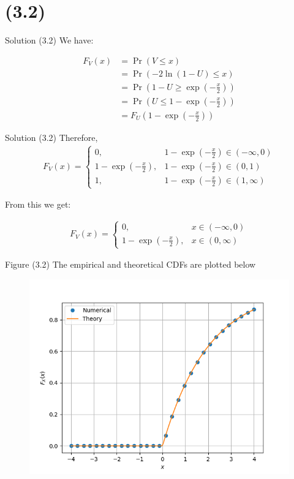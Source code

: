 \documentclass{beamer}
\providecommand{\pr}[1]{\ensuremath{\Pr\left(#1\right)}}
\begin{document}
\section{(3.2)}
\begin{frame}{Solution (3.2)}
    We have:
    
    \begin{align}
    F_V(x) &= \pr{V \leq x} \\
    &= \pr{-2\ln(1-U) \leq x} \\
    &= \pr{1-U \geq	\exp{\left(-\frac{x}{2}\right)}} \\
    &= \pr{U \leq 1 - \exp{\left(-\frac{x}{2}\right)}} \\
    &= F_U\left(1 - \exp{\left(-\frac{x}{2}\right)}\right) 
    \end{align}
    
    \end{frame}

\begin{frame}{Solution (3.2)}
    Therefore,
    \begin{align}
       F_V(x) =
        \begin{cases}
            0, & 1 - \exp{\left(-\frac{x}{2}\right)} \in (-\infty,0) \\
            1 - \exp{\left(-\frac{x}{2}\right)}, & 1 - \exp{\left(-\frac{x}{2}\right)} \in (0,1) \\
            1, & 1 - \exp{\left(-\frac{x}{2}\right)} \in (1, \infty)
        \end{cases}
    \end{align}
    
    From this we get:
    
    \begin{align}
       F_V(x) =
        \begin{cases}
            0, & x \in (-\infty,0) \\
            1 - \exp{\left(-\frac{x}{2}\right)}, & x \in (0,\infty) 
        \end{cases}
    \end{align}
\end{frame}

\begin{frame}{Figure (3.2)}
    The empirical and theoretical CDFs are plotted below
	\begin{figure}
		\centerline{\includegraphics[width=\textheight]{./figures/CDF_log.png}}
		\label{fig4}
	\end{figure}	
\end{frame}
\end{document}
